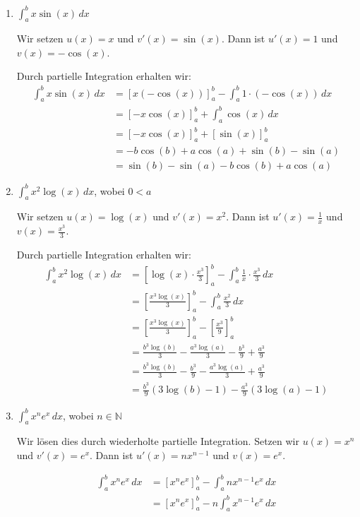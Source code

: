 \documentclass{article}
\begin{document}
\begin{enumerate}[label=(\alph*)]
\item $\int_a^b x\sin(x)\,dx$

Wir setzen $u(x) = x$ und $v'(x) = \sin(x)$. Dann ist $u'(x) = 1$ und $v(x) = -\cos(x)$.

Durch partielle Integration erhalten wir:
\begin{align}
\int_a^b x\sin(x)\,dx &= [x(-\cos(x))]_a^b - \int_a^b 1 \cdot (-\cos(x))\,dx\\
&= [-x\cos(x)]_a^b + \int_a^b \cos(x)\,dx\\
&= [-x\cos(x)]_a^b + [\sin(x)]_a^b\\
&= -b\cos(b) + a\cos(a) + \sin(b) - \sin(a)\\
&= \sin(b) - \sin(a) - b\cos(b) + a\cos(a)
\end{align}

\item $\int_a^b x^2\log(x)\,dx$, wobei $0<a$

Wir setzen $u(x) = \log(x)$ und $v'(x) = x^2$. Dann ist $u'(x) = \frac{1}{x}$ und $v(x) = \frac{x^3}{3}$.

Durch partielle Integration erhalten wir:
\begin{align}
\int_a^b x^2\log(x)\,dx &= \left[\log(x) \cdot \frac{x^3}{3}\right]_a^b - \int_a^b \frac{1}{x} \cdot \frac{x^3}{3}\,dx\\
&= \left[\frac{x^3\log(x)}{3}\right]_a^b - \int_a^b \frac{x^2}{3}\,dx\\
&= \left[\frac{x^3\log(x)}{3}\right]_a^b - \left[\frac{x^3}{9}\right]_a^b\\
&= \frac{b^3\log(b)}{3} - \frac{a^3\log(a)}{3} - \frac{b^3}{9} + \frac{a^3}{9}\\
&= \frac{b^3\log(b)}{3} - \frac{b^3}{9} - \frac{a^3\log(a)}{3} + \frac{a^3}{9}\\
&= \frac{b^3}{9}(3\log(b) - 1) - \frac{a^3}{9}(3\log(a) - 1)
\end{align}

\item $\int_a^b x^n e^x\,dx$, wobei $n\in\mathbb{N}$

Wir lösen dies durch wiederholte partielle Integration. Setzen wir $u(x) = x^n$ und $v'(x) = e^x$. 
Dann ist $u'(x) = nx^{n-1}$ und $v(x) = e^x$.

\begin{align}
\int_a^b x^n e^x\,dx &= [x^n e^x]_a^b - \int_a^b nx^{n-1} e^x\,dx\\
&= [x^n e^x]_a^b - n\int_a^b x^{n-1} e^x\,dx
\end{align}


\end{enumerate}
\end{document}
